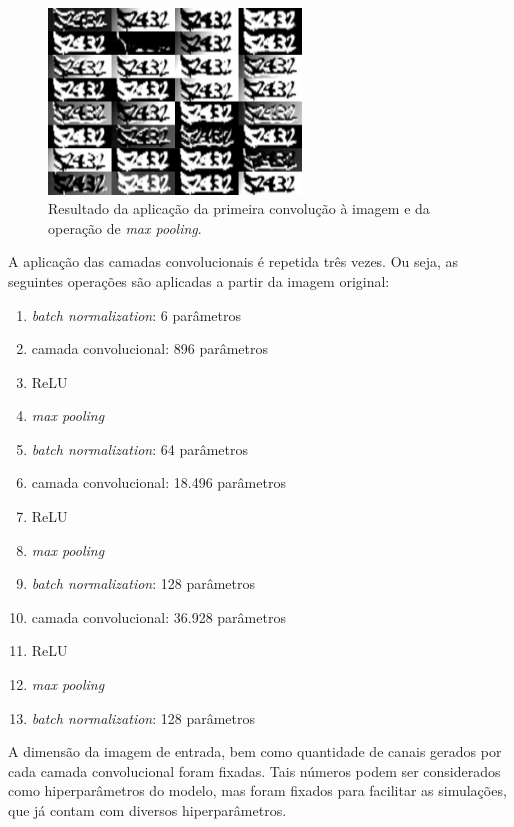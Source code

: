 \documentclass[12pt,twoside,brazilian]{book}
\providecommand{\tightlist}{%
  \setlength{\itemsep}{0pt}\setlength{\parskip}{0pt}}
\begin{document}
\begin{figure}

{\centering \includegraphics[width=0.6\textwidth,height=\textheight]{./assets/img/tjmg_conv1_modelo_max_pool.jpeg}

}

\caption{\label{fig-tjmg-exemplo-camada-conv-max-pool}Resultado da
aplicação da primeira convolução à imagem e da operação de \emph{max
pooling}.}

\end{figure}

A aplicação das camadas convolucionais é repetida três vezes. Ou seja,
as seguintes operações são aplicadas a partir da imagem original:

\begin{enumerate}
\def\labelenumi{\arabic{enumi}.}
\tightlist
\item
  \emph{batch normalization}: 6 parâmetros
\item
  camada convolucional: 896 parâmetros
\item
  ReLU
\item
  \emph{max pooling}
\item
  \emph{batch normalization}: 64 parâmetros
\item
  camada convolucional: 18.496 parâmetros
\item
  ReLU
\item
  \emph{max pooling}
\item
  \emph{batch normalization}: 128 parâmetros
\item
  camada convolucional: 36.928 parâmetros
\item
  ReLU
\item
  \emph{max pooling}
\item
  \emph{batch normalization}: 128 parâmetros
\end{enumerate}

A dimensão da imagem de entrada, bem como quantidade de canais gerados
por cada camada convolucional foram fixadas. Tais números podem ser
considerados como hiperparâmetros do modelo, mas foram fixados para
facilitar as simulações, que já contam com diversos hiperparâmetros.
\end{document}
